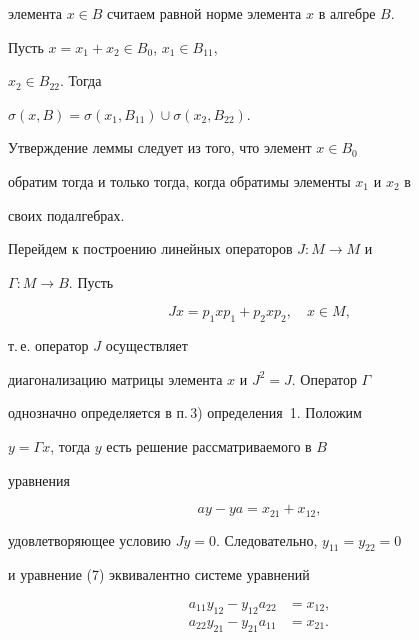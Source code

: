 элемента $x\in B$ считаем равной норме элемента $x$ в алгебре $B$.








\begin{lem}


Пусть $x=x_1+x_2\in B_0$, $x_1\in B_{11}$,


$x_2\in B_{22}$. Тогда


$\sigma(x,B)=\sigma(x_1,B_{11})\cup\sigma(x_2,B_{22})$.


\end{lem}





Утверждение леммы следует из того, что элемент $x\in B_0$


обратим тогда и только тогда, когда обратимы элементы $x_1$ и $x_2$ в


своих подалгебрах.





Перейдем к построению линейных операторов $J:M\to M$ и


$\Gamma:M\to B$. Пусть


$$


Jx=p_1xp_1+p_2xp_2,\quad x\in M,


$$


т.\,е. оператор $J$ осуществляет


диагонализацию матрицы элемента $x$ и $J^2=J$. Оператор $\Gamma$


однозначно определяется в п.\,3) определения~1. Положим


$y=\Gamma x$, тогда $y$ есть решение рассматриваемого в $B$


уравнения


\begin{equation}


ay-ya=x_{21}+x_{12},


\end{equation}


удовлетворяющее условию $Jy=0$. Следовательно, $y_{11}=y_{22}=0$ 


и уравнение (7) эквивалентно системе уравнений


\begin{align*}


a_{11}y_{12}-y_{12}a_{22}&=x_{12},\\


a_{22}y_{21}-y_{21}a_{11}&=x_{21}.


\end{align*}


